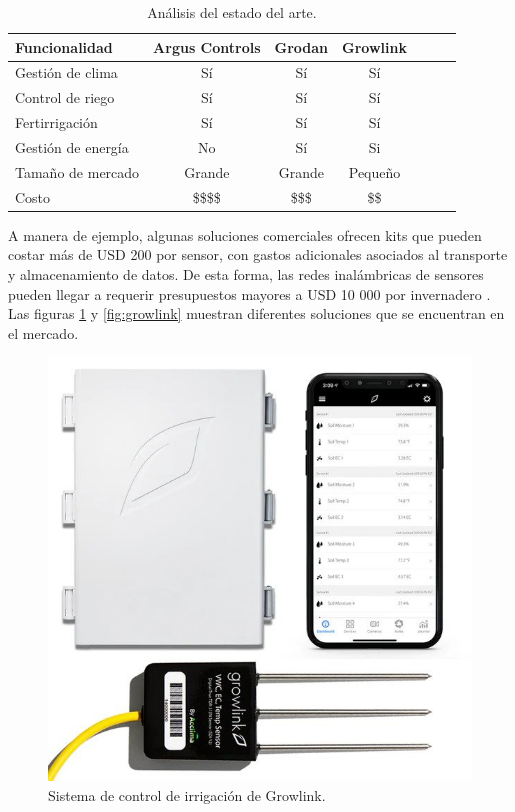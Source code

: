 \begin{table}[h]
\centering
\caption[Análisis del estado del arte]{Análisis del estado del arte.}

\begin{tabular}{lcccccc} 
\toprule
\textbf{Funcionalidad} & \textbf{Argus Controls \citep{arguscontrol}} &\textbf{Grodan \citep{grodan}} & \textbf{Growlink \citep{growlink}}\\

\midrule
Gestión de clima    & Sí & Sí & Sí \\
Control de riego    & Sí & Sí & Sí \\
Fertirrigación      & Sí & Sí & Sí \\
Gestión de energía  & No & Sí & Si \\
Tamaño de mercado   & Grande & Grande & Pequeño \\
Costo               &  \$\$\$\$ & \$\$\$ &  \$\$ \\
\bottomrule
\hline
\end{tabular}
\label{tab:vendors}
\end{table}

\pagebreak
A manera de ejemplo, algunas soluciones comerciales ofrecen kits que pueden costar más de USD 200 por sensor, con gastos adicionales asociados al transporte y almacenamiento de datos. De esta forma, las redes inalámbricas de sensores pueden llegar a requerir presupuestos mayores a USD 10 000 por invernadero \citep{digger:1}. Las figuras \ref{fig:grodan} y \ref{fig:growlink} muestran diferentes soluciones que se encuentran en el mercado. 

\begin{figure}[htb]
\centering 
\includegraphics[width=.5\textwidth]{../Figures/growlink.jpg}
\caption[Sistema de control de irrigación de Growlink]{Sistema de control de irrigación de Growlink\protect\footnotemark.}
\label{fig:grodan}
\end{figure}


